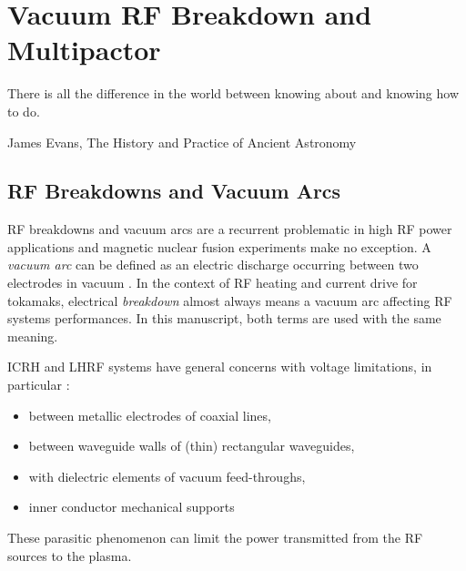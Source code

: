 
\setchapterpreamble[u]{\margintoc}
\chapter{Vacuum RF Breakdown and Multipactor}\label{chap:Multipactor}

\epigraph{There is all the difference in the world between knowing about and knowing how to do.}{James Evans, The History and Practice of Ancient Astronomy}


\section[RF Breakdowns]{RF Breakdowns and Vacuum Arcs}
RF breakdowns and vacuum arcs are a recurrent problematic in high RF power applications and magnetic nuclear fusion experiments make no exception. A \textit{vacuum arc} can be defined as an electric discharge occurring between two electrodes in vacuum . In the context of RF heating and current drive for tokamaks, electrical \textit{breakdown} almost always means a vacuum arc affecting RF systems performances. In this manuscript, both terms are used with the same meaning.

ICRH and LHRF systems have general concerns with voltage limitations, in particular :
\begin{itemize}
	\item between metallic electrodes of coaxial lines,
	\item between waveguide walls of (thin) rectangular waveguides,
	\item with dielectric elements of vacuum feed-throughs,
	\item inner conductor mechanical supports
\end{itemize}
These parasitic phenomenon can limit the power transmitted from the RF sources to the plasma.

